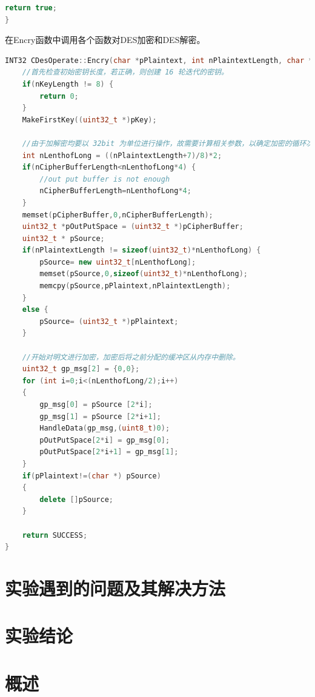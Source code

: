 \documentclass[UTF8,a4paper,10pt]{ctexart}
\begin{document}
\begin{itemize}
\begin{lstlisting}[language = c++]
  return true;
}
  \end{lstlisting}
  在Encry函数中调用各个函数对DES加密和DES解密。
  \begin{lstlisting}[language = c++]
INT32 CDesOperate::Encry(char *pPlaintext, int nPlaintextLength, char *pCipherBuffer, int &nCipherBufferLength, char *pKey, int nKeyLength) {
    //首先检查初始密钥长度，若正确，则创建 16 轮迭代的密钥。
    if(nKeyLength != 8) {
        return 0;
    }
    MakeFirstKey((uint32_t *)pKey);

    //由于加解密均要以 32bit 为单位进行操作，故需要计算相关参数，以确定加密的循环次数以及密文缓冲区是否够用，确定后将需要加密的明文格式化到新分配的缓冲区内。
    int nLenthofLong = ((nPlaintextLength+7)/8)*2;
    if(nCipherBufferLength<nLenthofLong*4) {
        //out put buffer is not enough
        nCipherBufferLength=nLenthofLong*4;
    }
    memset(pCipherBuffer,0,nCipherBufferLength);
    uint32_t *pOutPutSpace = (uint32_t *)pCipherBuffer;
    uint32_t * pSource;
    if(nPlaintextLength != sizeof(uint32_t)*nLenthofLong) {
        pSource= new uint32_t[nLenthofLong];
        memset(pSource,0,sizeof(uint32_t)*nLenthofLong);
        memcpy(pSource,pPlaintext,nPlaintextLength);
    }
    else {
        pSource= (uint32_t *)pPlaintext;
    }

    //开始对明文进行加密，加密后将之前分配的缓冲区从内存中删除。
    uint32_t gp_msg[2] = {0,0};
    for (int i=0;i<(nLenthofLong/2);i++)
    {
        gp_msg[0] = pSource [2*i];
        gp_msg[1] = pSource [2*i+1];
        HandleData(gp_msg,(uint8_t)0);
        pOutPutSpace[2*i] = gp_msg[0];
        pOutPutSpace[2*i+1] = gp_msg[1];
    }
    if(pPlaintext!=(char *) pSource)
    {
        delete []pSource;
    }
    
    return SUCCESS;
}
  \end{lstlisting}
  
  
\end{itemize}

\section{实验遇到的问题及其解决方法}

\section{实验结论}








\section{概述}
\end{document}
